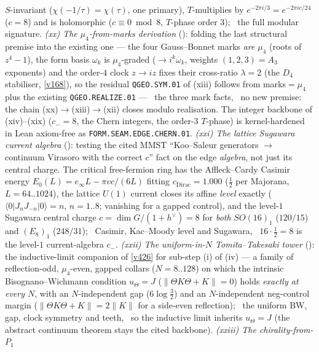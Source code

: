 \documentclass[11pt,a4paper]{article}
\begin{document}
\begin{keybox}
$S$-invariant ($\chi(-1/\tau){=}\chi(\tau)$, one primary), $T$-multiplies by $e^{-2\pi i/3}{=}e^{-2\pi i c/24}$
($c{=}8$) and is holomorphic ($c\equiv0\bmod8$, $T$-phase order $3$); \mE\ the full modular signature.
\emph{(xx) The $\mu_4$-from-marks derivation} (): folding the last structural
premise into the existing one --- the four Gauss--Bonnet marks \emph{are} $\mu_4$ (roots of $z^4{-}1$), the form
basis $\omega_k$ is $\mu_4$-graded ($\to i^k\omega_k$, weights $(1,2,3){=}A_3$ exponents) and the order-$4$ clock
$z\!\to\!iz$ fixes their cross-ratio $\lambda{=}2$ (the $D_4$ stabiliser, \vref{v168}), so the residual
\texttt{QGEO.SYM.01} of (xiii) follows from marks$=\mu_4$ plus the existing \texttt{QGEO.REALIZE.01} --- \mE\ the
three mark facts, \mC\ no new premise: the chain (xx)$\to$(xiii)$\to$(xii) closes modulo realisation. The integer
backbone of (xiv)--(xix) ($c_-{=}8$, the Chern integers, the order-$3$ $T$-phase) is kernel-hardened in Lean
axiom-free as \texttt{FORM.SEAM.EDGE.CHERN.01}.
\emph{(xxi) The lattice Sugawara current algebra} (): testing the cited MMST
``Koo--Saleur generators $\to$ continuum Virasoro with the correct $c$'' fact on the edge \emph{algebra}, not just
its central charge. The critical free-fermion ring has the Affleck--Cardy Casimir energy $E_0(L){=}e_\infty L{-}\pi v
c/(6L)$ fitting $c_{\mathrm{Dirac}}{=}1.000$ ($\tfrac12$ per Majorana, $L{=}64..1024$), the lattice $U(1)$ current
closes its affine \emph{level} exactly ($\langle0|J_nJ_{-n}|0\rangle{=}n$, $n{=}1..8$; vanishing for a gapped
control), and the level-$1$ Sugawara central charge $c{=}\dim G/(1{+}h^\vee){=}8$ for \emph{both} $SO(16)_1$
($120/15$) and $(E_8)_1$ ($248/31$); \mE\ Casimir, Kac--Moody level and Sugawara, \mC\ $16{\cdot}\tfrac12{=}8$ is the
level-$1$ current-algebra $c_-$. \emph{(xxii) The uniform-in-$N$ Tomita--Takesaki tower}
(): the inductive-limit companion of \vref{v426} for sub-step (i) of (iv) --- a
family of reflection-odd, $\mu_4$-even, gapped collars ($N{=}8..128$) on which the intrinsic Bisognano--Wichmann
condition $u_\Theta{=}J$ ($\|\Theta K\Theta{+}K\|{=}0$) holds \emph{exactly at every $N$}, with an $N$-independent gap
($6\log\tfrac32$) and an $N$-independent neg-control margin ($\|\Theta K\Theta{+}K\|{=}2\|K\|$ for a side-even
reflection); \mE\ the uniform BW, gap, clock symmetry and teeth, \mC\mO\ so the inductive limit inherits
$u_\Theta{=}J$ (the abstract continuum theorem stays the cited backbone). \emph{(xxiii) The chirality-from-$P_1$
}
\end{keybox}
\end{document}
